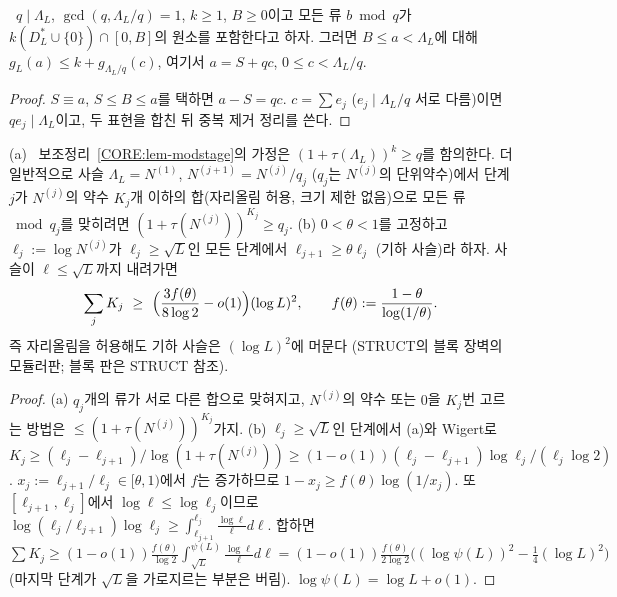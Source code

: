 \begin{lemma}[모듈러 단계]\label{CORE:lem-modstage}
\PROVED\ $q\mid\Lambda_L$, $\gcd(q,\Lambda_L/q)=1$, $k\ge1$, $B\ge0$이고 모든 류 $b\bmod q$가 $k(D^*_L\cup\{0\})\cap[0,B]$의 원소를 포함한다고 하자. 그러면 $B\le a<\Lambda_L$에 대해 $g_L(a)\le k+g_{\Lambda_L/q}(c)$, 여기서 $a=S+qc$, $0\le c<\Lambda_L/q$.
\end{lemma}
\begin{proof}
$S\equiv a$, $S\le B\le a$를 택하면 $a-S=qc$. $c=\sum e_j$ ($e_j\mid\Lambda_L/q$ 서로 다름)이면 $qe_j\mid\Lambda_L$이고, 두 표현을 합친 뒤 중복 제거 정리를 쓴다.
\end{proof}

\begin{proposition}\label{CORE:prop-carry}
(a) \PROVED\ 보조정리~\ref{CORE:lem-modstage}의 가정은 $(1+\tau(\Lambda_L))^k\ge q$를 함의한다. 더 일반적으로 사슬 $\Lambda_L=N^{(1)}$, $N^{(j+1)}=N^{(j)}/q_j$ ($q_j$는 $N^{(j)}$의 단위약수)에서 단계 $j$가 $N^{(j)}$의 약수 $K_j$개 이하의 합(자리올림 허용, 크기 제한 없음)으로 모든 류 $\bmod q_j$를 맞히려면 $(1+\tau(N^{(j)}))^{K_j}\ge q_j$.
(b)  $0<\theta<1$를 고정하고 $\ell_j:=\log N^{(j)}$가 $\ell_j\ge\sqrt L$인 모든 단계에서 $\ell_{j+1}\ge\theta\ell_j$ (기하 사슬)라 하자. 사슬이 $\ell\le\sqrt L$까지 내려가면
\[
\sum_jK_j\ \ge\ \Bigl(\frac{3f(\theta)}{8\log2}-o(1)\Bigr)(\log L)^2,\qquad f(\theta):=\frac{1-\theta}{\log(1/\theta)}.
\]
즉 자리올림을 허용해도 기하 사슬은 $(\log L)^2$에 머문다 (STRUCT의 블록 장벽의 모듈러판; 블록 판은 STRUCT 참조).
\end{proposition}
\begin{proof}
(a) $q_j$개의 류가 서로 다른 합으로 맞혀지고, $N^{(j)}$의 약수 또는 $0$을 $K_j$번 고르는 방법은 $\le(1+\tau(N^{(j)}))^{K_j}$가지.
(b) $\ell_j\ge\sqrt L$인 단계에서 (a)와 Wigert로 $K_j\ge(\ell_j-\ell_{j+1})/\log(1+\tau(N^{(j)}))\ge(1-o(1))(\ell_j-\ell_{j+1})\log\ell_j/(\ell_j\log2)$. $x_j:=\ell_{j+1}/\ell_j\in[\theta,1)$에서 $f$는 증가하므로 $1-x_j\ge f(\theta)\log(1/x_j)$. 또 $[\ell_{j+1},\ell_j]$에서 $\log\ell\le\log\ell_j$이므로 $\log(\ell_j/\ell_{j+1})\log\ell_j\ge\int_{\ell_{j+1}}^{\ell_j}\frac{\log\ell}{\ell}d\ell$. 합하면 $\sum K_j\ge(1-o(1))\frac{f(\theta)}{\log2}\int_{\sqrt L}^{\psi(L)}\frac{\log\ell}{\ell}d\ell=(1-o(1))\frac{f(\theta)}{2\log2}\bigl((\log\psi(L))^2-\tfrac14(\log L)^2\bigr)$ (마지막 단계가 $\sqrt L$을 가로지르는 부분은 버림). $\log\psi(L)=\log L+o(1)$.
\end{proof}

